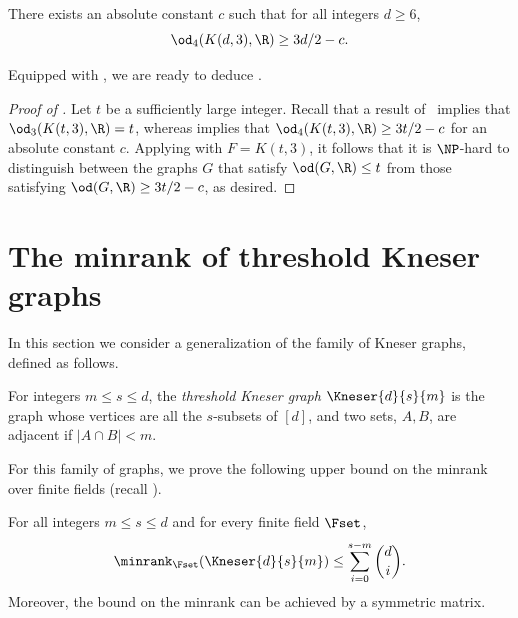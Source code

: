 \begin{corollary}\label{cor:3/2}
There exists an absolute constant $c$ such that for all integers $d \geq 6$,
\[\od_{4}(K(d,3),\R) \geq 3d/2-c.\]
\end{corollary}

Equipped with , we are ready to deduce .

\begin{proof}[Proof of ]
Let $t$ be a sufficiently large integer. Recall that a result of~\cite{BukhC18} implies that $\od_3(K(t,3),\R) = t$, whereas  implies that $\od_{4}(K(t,3),\R) \geq 3t/2-c$ for an absolute constant $c$.
Applying  with $F = K(t,3)$, it follows that it is $\NP$-hard to 
%
%
distinguish between the graphs $G$ that satisfy $\od(G,\R) \leq t$ from those satisfying $\od(G,\R) \geq 3t/2-c$, as desired.
\end{proof}


%
\section{The minrank of threshold Kneser graphs}\label{sec:ODofGenKneser}

In this section we consider a generalization of the family of
Kneser graphs, defined as follows.  %

%
\begin{definition}\label{def:GenKneser}
%
  For integers $m \leq s \leq d$, the
%
\emph{threshold Kneser graph}   %
$\Kneser{d}{s}{m}$ is the graph whose vertices are all the $s$-subsets of $[d]$,
%
and   %
two sets, $A,B$, %
are adjacent if $|A \cap B| < m$.
\end{definition}

For this family of graphs, we prove the following upper bound on the minrank
%
%
over finite fields (recall ).

\begin{theorem}\label{thm:minrk_Kneser}
For all integers $m \leq s \leq d$ and for every finite field $\Fset$,
\[{\minrank}_{\Fset}(\Kneser{d}{s}{m}) \leq \sum_{i=0}^{s-m}\binom{d}{i}.\]
Moreover, the bound on the minrank can be achieved by a symmetric matrix.
\end{theorem}

